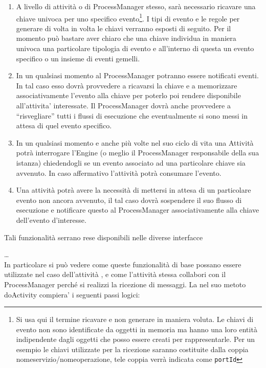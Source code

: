 \begin{enumerate}
  \item A livello di attività o di ProcessManager stesso,
  sarà necessario ricavare una chiave univoca per uno specifico 
  evento\footnote{Si usa qui il termine ricavare e non generare in maniera
  voluta. Le chiavi di evento non sono identificate da oggetti in memoria ma
  hanno una loro entità indipendente
  dagli oggetti che posso essere creati per rappresentarle. Per un esempio le
  chiavi utilizzate per la ricezione saranno costituite dalla coppia
  nomeservizio/nomeoperazione, tele coppia verrà indicata come
  \texttt{portId} }. I tipi di evento e le regole per generare di volta in volta 
  le chiavi verranno esposti di seguito. Per il momento può bastare aver
  chiaro che una chiave individua in maniera univoca una particolare tipologia di evento e all'interno di questa un evento specifico o un insieme
  di eventi gemelli.
  
  \item In un qualsiasi momento al ProcessManager potranno essere notificati
  eventi. In tal caso esso dovrà provvedere a ricavarsi la chiave e a
  memorizzare associativamente l'evento alla chiave per poterlo poi rendere
  disponibile all'attivita' interessate. Il ProcessManager dovrà anche
  provvedere a ``risvegliare'' tutti i flussi di esecuzione che
  eventualmente si sono messi in attesa di quel evento specifico.
   
  \item In un qualsiasi momento e anche più volte nel suo ciclo di vita una
  Attività potrà interrogare l'Engine (o meglio il ProcessManager responsabile
  della sua istanza) chiedendogli se un evento associato ad una particolare
  chiave sia avvenuto. In caso affermativo l'attività potrà consumare l'evento.

  \item Una attività potrà avere la necessità di mettersi in attesa di un
  particolare evento non ancora avvenuto, il tal caso dovrà sospendere il
  suo flusso di esecuzione e notificare questo al ProcessManager
  associativamente alla chiave dell'evento d'interesse. 
\end{enumerate}

Tali funzionalità serrano rese disponibili nelle diverse interfacce 


\ldots
\\

In particolare si può vedere come queste funzionalità di base possano essere
utilizzate nel caso dell'attività , e come
l'attività stessa collabori con il ProcessManager perché si realizzi la
ricezione di messaggi. La  nel suo metoto doActivity
compiera' i seguenti passi logici:

